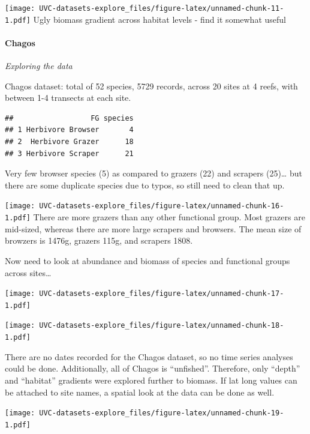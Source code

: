 \documentclass[]{article}
\let\oldparagraph\paragraph
\renewcommand{\paragraph}[1]{\oldparagraph{#1}\mbox{}}
\begin{document}
\texttt{[image: UVC-datasets-explore\_files/figure-latex/unnamed-chunk-11-1.pdf]}
Ugly biomass gradient across habitat levels - find it somewhat useful

\paragraph{Chagos}\label{chagos}

\emph{Exploring the data}

Chagos dataset: total of 52 species, 5729 records, across 20 sites at 4
reefs, with between 1-4 transects at each site.

\begin{verbatim}
##                  FG species
## 1 Herbivore Browser       4
## 2  Herbivore Grazer      18
## 3 Herbivore Scraper      21
\end{verbatim}

Very few browser species (5) as compared to grazers (22) and scrapers
(25)\ldots{} but there are some duplicate species due to typos, so still
need to clean that up.

\texttt{[image: UVC-datasets-explore\_files/figure-latex/unnamed-chunk-16-1.pdf]}
There are more grazers than any other functional group. Most grazers are
mid-sized, whereas there are more large scrapers and browsers. The mean
size of browzers is 1476g, grazers 115g, and scrapers 1808.

Now need to look at abundance and biomass of species and functional
groups across sites\ldots{}

\texttt{[image: UVC-datasets-explore\_files/figure-latex/unnamed-chunk-17-1.pdf]}

\texttt{[image: UVC-datasets-explore\_files/figure-latex/unnamed-chunk-18-1.pdf]}

There are no dates recorded for the Chagos dataset, so no time series
analyses could be done. Additionally, all of Chagos is ``unfished''.
Therefore, only ``depth'' and ``habitat'' gradients were explored
further to biomass. If lat long values can be attached to site names, a
spatial look at the data can be done as well.

\texttt{[image: UVC-datasets-explore\_files/figure-latex/unnamed-chunk-19-1.pdf]}
\end{document}
